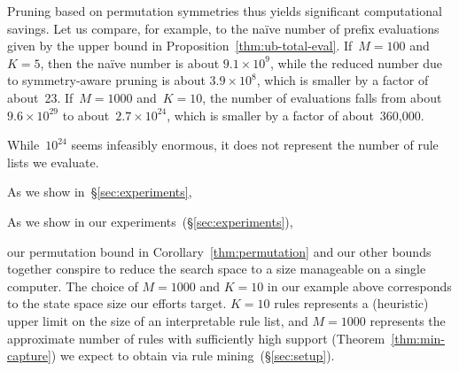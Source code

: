 \documentclass[twoside,11pt]{article}
\begin{document}
Pruning based on permutation symmetries thus yields significant
computational savings.
%
Let us compare, for example, to the na\"ive number of prefix evaluations
given by the upper bound in Proposition~\ref{thm:ub-total-eval}.
%
If~${M = 100}$ and~${K = 5}$, then the na\"ive number is about
${9.1 \times 10^9}$, while the reduced number due to symmetry-aware
pruning is about ${3.9 \times 10^8}$,
which is smaller by a factor of about~23.
%
If~${M=1000}$ and~${K = 10}$, the number of evaluations falls from
about~${9.6 \times 10^{29}}$ to about~${2.7 \times 10^{24}}$,
which is smaller by a factor of about~360,000.
\begin{arxiv}

\end{arxiv}
\begin{kdd}
%
\end{kdd}
While~$10^{24}$ seems infeasibly enormous,
it does not represent the number of rule lists we evaluate.
%
\begin{kdd}
As we show in~\S\ref{sec:experiments},
\end{kdd}
\begin{arxiv}
As we show in our experiments~(\S\ref{sec:experiments}),
\end{arxiv}
our permutation bound in Corollary~\ref{thm:permutation}
and our other bounds together conspire to reduce the search space
to a size manageable on a single computer.
%
The choice of ${M=1000}$ and ${K=10}$ in our example above
corresponds to the state space size our efforts target.
%
${K=10}$ rules represents a (heuristic) upper limit on
the size of an interpretable rule list,
and ${M=1000}$ represents the approximate number of rules
with sufficiently high support (Theorem~\ref{thm:min-capture})
we expect to obtain via rule mining~(\S\ref{sec:setup}).
\end{document}
